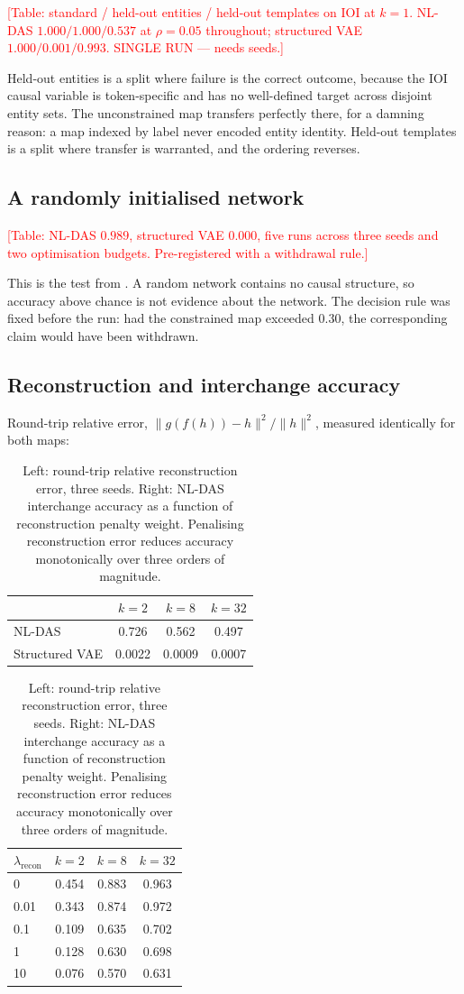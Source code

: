 \documentclass[11pt]{article}
\newcommand{\TODO}[1]{\textcolor{red}{[#1]}}
\begin{document}
\TODO{Table: standard / held-out entities / held-out templates on IOI at $k=1$.
NL-DAS $1.000/1.000/0.537$ at $\rho = 0.05$ throughout; structured VAE
$1.000/0.001/0.993$. SINGLE RUN --- needs seeds.}

Held-out entities is a split where failure is the correct outcome, because the
IOI causal variable is token-specific and has no well-defined target across
disjoint entity sets. The unconstrained map transfers perfectly there, for a
damning reason: a map indexed by label never encoded entity identity. Held-out
templates is a split where transfer is warranted, and the ordering reverses.

\subsection{A randomly initialised network}
\label{sec:random}

\TODO{Table: NL-DAS $0.989$, structured VAE $0.000$, five runs across three seeds
and two optimisation budgets. Pre-registered with a withdrawal rule.}

This is the test from \citet{sutter2025nonlinear}. A random network contains no
causal structure, so accuracy above chance is not evidence about the network. The
decision rule was fixed before the run: had the constrained map exceeded $0.30$,
the corresponding claim would have been withdrawn.

\subsection{Reconstruction and interchange accuracy}

Round-trip relative error, $\lVert g(f(h)) - h \rVert^2 / \lVert h \rVert^2$,
measured identically for both maps:

\begin{table}[t]
\centering\small
\begin{tabular}{lccc}
\toprule
& $k{=}2$ & $k{=}8$ & $k{=}32$ \\
\midrule
NL-DAS         & 0.726 & 0.562 & 0.497 \\
Structured VAE & 0.0022 & 0.0009 & 0.0007 \\
\bottomrule
\end{tabular}
\hspace{1em}
\begin{tabular}{lccc}
\toprule
$\lambda_\text{recon}$ & $k{=}2$ & $k{=}8$ & $k{=}32$ \\
\midrule
0     & 0.454 & 0.883 & 0.963 \\
0.01  & 0.343 & 0.874 & 0.972 \\
0.1   & 0.109 & 0.635 & 0.702 \\
1     & 0.128 & 0.630 & 0.698 \\
10    & 0.076 & 0.570 & 0.631 \\
\bottomrule
\end{tabular}
\caption{Left: round-trip relative reconstruction error, three seeds. Right:
NL-DAS interchange accuracy as a function of reconstruction penalty weight.
Penalising reconstruction error reduces accuracy monotonically over three orders
of magnitude.}
\end{table}
\end{document}

